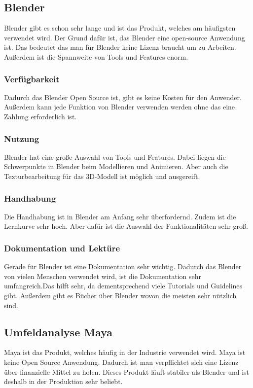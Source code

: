 \pagebreak

\subsection{Blender}
Blender gibt es schon sehr lange und ist das Produkt, welches am häufigsten verwendet wird. Der Grund dafür ist, das Blender eine open-source Anwendung ist. Das bedeutet das man für Blender keine Lizenz braucht um zu Arbeiten. Außerdem ist die Spannweite von Tools und Features enorm.




\subsubsection{Verfügbarkeit}
 Dadurch das Blender Open Source ist, gibt es keine Kosten für den Anwender. Außerdem kann jede Funktion von Blender verwenden werden ohne das eine Zahlung erforderlich ist.

\subsubsection{Nutzung}
Blender hat eine große Auswahl von Tools und Features. Dabei liegen die Schwerpunkte in Blender beim Modellieren und Animieren. Aber auch die Texturbearbeitung für das 3D-Modell ist möglich und ausgereift.

\subsubsection{Handhabung}
Die Handhabung ist in Blender am Anfang sehr überfordernd. Zudem ist die Lernkurve sehr hoch. Aber dafür ist die Auswahl der Funktionalitäten sehr groß.

\subsubsection{Dokumentation und Lektüre}
Gerade für Blender ist eine Dokumentation sehr wichtig. Dadurch das Blender von vielen Menschen verwendet wird, ist die Dokumentation sehr umfangreich.Das hilft sehr, da dementsprechend viele Tutorials und Guidelines gibt. Außerdem gibt es Bücher über Blender wovon die meisten sehr nützlich sind.

\pagebreak

\subsection{Umfeldanalyse Maya}
Maya ist das Produkt, welches häufig in der Industrie verwendet wird. Maya ist keine Open Source Anwendung. Dadurch ist man verpflichtet sich eine Lizenz über finanzielle Mittel zu holen. Dieses Produkt läuft stabiler als Blender und ist deshalb in der Produktion sehr beliebt.



